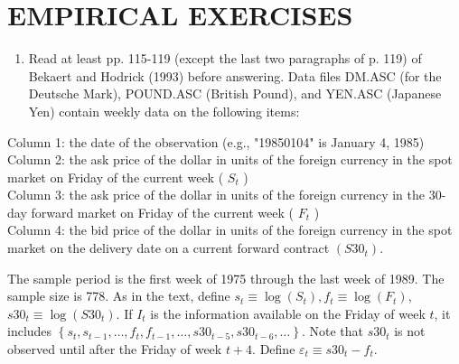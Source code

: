 \documentclass[10pt]{article}
\begin{document}
\section*{EMPIRICAL EXERCISES}
\begin{enumerate}
  \item Read at least pp. 115-119 (except the last two paragraphs of p. 119) of Bekaert and Hodrick (1993) before answering. Data files DM.ASC (for the Deutsche Mark), POUND.ASC (British Pound), and YEN.ASC (Japanese Yen) contain weekly data on the following items:
\end{enumerate}

Column 1: the date of the observation (e.g., "19850104" is January 4, 1985)\\
Column 2: the ask price of the dollar in units of the foreign currency in the spot market on Friday of the current week ( $S_{t}$ )\\
Column 3: the ask price of the dollar in units of the foreign currency in the 30-day forward market on Friday of the current week ( $F_{t}$ )\\
Column 4: the bid price of the dollar in units of the foreign currency in the spot market on the delivery date on a current forward contract $\left(S 30_{t}\right)$.

The sample period is the first week of 1975 through the last week of 1989. The sample size is 778. As in the text, define $s_{t} \equiv \log \left(S_{t}\right), f_{t} \equiv \log \left(F_{t}\right)$, $s 30_{t} \equiv \log \left(S 30_{t}\right)$. If $I_{t}$ is the information available on the Friday of week $t$, it includes $\left\{s_{t}, s_{t-1}, \ldots, f_{t}, f_{t-1}, \ldots, s 30_{t-5}, s 30_{t-6}, \ldots\right\}$. Note that $s 30_{t}$ is not observed until after the Friday of week $t+4$. Define $\varepsilon_{t} \equiv s 30_{t}-f_{t}$.
\end{document}
